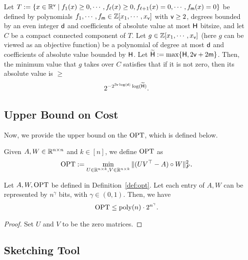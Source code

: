 \begin{theorem} \label{thm:jpt13}
Let $T := \{x \in \mathbb{R}^{\mathsf{v}} \mid f_{1}(x) \geq 0, \cdots ,f_{\ell}(x) \geq 0, f_{\ell+1}(x)=0, \cdots, f_{\mathsf{m}}(x)=0 \}$ be defined by polynomials $f_{1}, \cdots, f_{\mathsf{m}} \in \mathbb{Z} [x_{1}, \cdots, x_{\mathsf{v}} ]$ 
with $\mathsf{v} \geq 2$, degrees bounded by an even integer $\mathsf{d}$ and coefficients of absolute value at most $\mathsf{H}$ bitsize, and let $C$ be a compact connected component of $T$. Let $g \in \mathbb{Z} [x_{1}, \cdots, x_{\mathsf{v}} ]$ (here $g$ can be viewed as an objective function) be a polynomial of degree at most $\mathsf{d}$ and coefficients of absolute value bounded by $\mathsf{H}$. Let $\widetilde{\mathsf{H}}:=\max \{\mathsf{H}, 2 \mathsf{v}+2 \mathsf{m}\}$. Then, the minimum value that $g$ takes over $C$ satisfies that if it is not zero, then its absolute value is $\geq $  
\begin{align*}
 2^{- 2^{3\mathsf{v} \log(\mathsf{d})} \log( \widetilde{\mathsf{H}} )}.
\end{align*}
\end{theorem}




\subsection{Upper Bound on Cost}\label{sec:upper_bound}
Now, we provide the upper bound on the $\operatorname{OPT}$, which is defined below. 

\begin{definition}\label{def:opt}
Given $A, W \in \mathbb{R}^{n \times n}$ and $k \in [n]$, we define $\operatorname{OPT}$ as
    \begin{align*}
        \operatorname{OPT} := \min _{U \in \mathbb{R}^{n \times k}, V \in \mathbb{R}^{n \times k}}\|(U V^\top-A) \circ W\|_F^2 .
    \end{align*}
\end{definition}

\begin{lemma}[folklore]\label{lem:opt}
Let $A, W, \operatorname{OPT}$ be defined in Definition~\ref{def:opt}. Let each entry of $A,W$ can be represented by $n^{\gamma}$ bits, with $\gamma \in (0,1)$. Then, we have
\begin{align*}
\operatorname{OPT} \leq \operatorname{poly}(n) \cdot 2^{n^{\gamma}}.
\end{align*}
\end{lemma}

\begin{proof}
Set $U$ and $V$ to be the zero matrices.
\end{proof}

\subsection{Sketching Tool}
 
